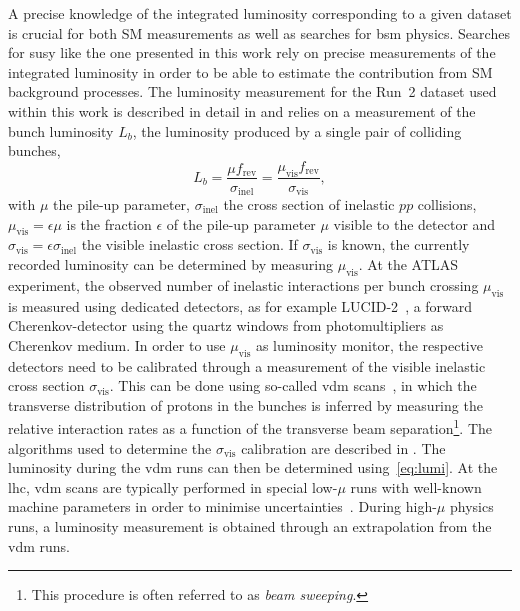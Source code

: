 A precise knowledge of the integrated luminosity corresponding to a given dataset is crucial for both SM measurements as well as searches for \gls{bsm} physics. Searches for \gls{susy} like the one presented in this work rely on precise measurements of the integrated luminosity in order to be able to estimate the contribution from SM background processes. The luminosity measurement for the Run~2 dataset used within this work is described in detail in \cite{ATLAS-CONF-2019-021,Aaboud:2016hhf} and relies on a measurement of the bunch luminosity $L_b$, \ie the luminosity produced by a single pair of colliding bunches,
\begin{equation}
	L_b = \frac{\mu f_\mathrm{rev}}{	\sigma_\mathrm{inel}} = \frac{\mu_\mathrm{vis}f_\mathrm{rev}}{\sigma_\mathrm{vis}},
\end{equation}
with $\mu$ the pile-up parameter, $\sigma_\mathrm{inel}$ the cross section of inelastic $pp$ collisions, $\mu_\mathrm{vis} = \epsilon \mu$ is the fraction $\epsilon$ of the pile-up parameter $\mu$ visible to the detector and $\sigma_\mathrm{vis} = \epsilon\sigma_\mathrm{inel}$ the visible inelastic cross section. If $\sigma_\mathrm{vis}$ is known, the currently recorded luminosity can be determined by measuring $\mu_\mathrm{vis}$. At the ATLAS experiment, the observed number of inelastic interactions per bunch crossing $\mu_\mathrm{vis}$ is measured using dedicated detectors, as for example LUCID-2~\cite{Avoni_2018}, a forward Cherenkov-detector using the quartz windows from photomultipliers as Cherenkov medium.
In order to use $\mu_\mathrm{vis}$ as luminosity monitor, the respective detectors need to be calibrated through a measurement of the visible inelastic cross section $\sigma_\mathrm{vis}$. This can be done using so-called \gls{vdm} scans~\cite{vanderMeer:296752,GRAFSTROM201597}, in which the transverse distribution of protons in the bunches is inferred by measuring the relative interaction rates as a function of the transverse beam separation\footnote{This procedure is often referred to as \textit{beam sweeping}.}. The algorithms used to determine the $\sigma_\mathrm{vis}$ calibration are described in \cite{ATLAS-CONF-2019-021,Aaboud:2016hhf}. The luminosity during the \gls{vdm} runs can then be determined using~\cref{eq:lumi}. At the \gls{lhc}, \gls{vdm} scans are typically performed in special low-$\mu$ runs with well-known machine parameters in order to minimise uncertainties~\cite{ATLAS-CONF-2019-021}. During high-$\mu$ physics runs, a luminosity measurement is obtained through an extrapolation from the \gls{vdm} runs.

